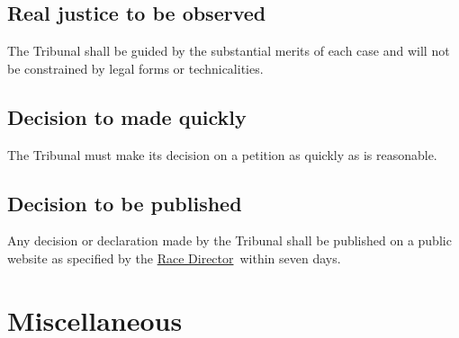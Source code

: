 \documentclass[12pt]{report}
\newcommand{\hyplink}[1]{\hyperlink{#1}{{#1}}}
\newcommand{\RaceDirector}{\hyplink{Race Director}}
\begin{document}
  \section{Real justice to be observed}
  \begin{fenumerate} \item
The Tribunal shall be guided by the substantial merits of each case and will not be constrained by legal forms or technicalities.%
\end{fenumerate}
    \section{Decision to made quickly}
    \begin{fenumerate}
      \item The Tribunal must make its decision on a petition as quickly as is reasonable.
    \end{fenumerate}
\section{Decision to be published}
\begin{fenumerate}
  \item Any decision or declaration made by the Tribunal shall be published on a public website as specified by the \RaceDirector\ within seven days.
\end{fenumerate}
  \chapter{Miscellaneous}
\end{document}
